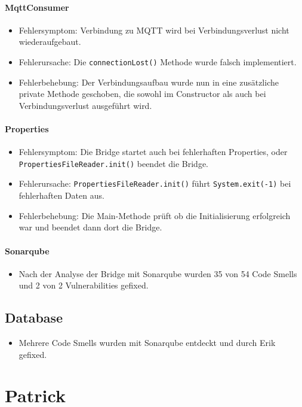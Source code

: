 \paragraph{MqttConsumer}
\begin{itemize}
	\item Fehlersymptom: Verbindung zu MQTT wird bei Verbindungsverlust nicht wiederaufgebaut.
	\item Fehlerursache: Die \texttt{connectionLost()} Methode wurde falsch implementiert.
	\item Fehlerbehebung: Der Verbindungsaufbau wurde nun in eine zusätzliche private Methode geschoben, die sowohl im Constructor als auch bei Verbindungsverlust ausgeführt wird.
\end{itemize}

\paragraph{Properties}
\begin{itemize}
	\item Fehlersymptom: Die Bridge startet auch bei fehlerhaften Properties, oder \texttt{PropertiesFileReader.init()} beendet die Bridge.
	\item Fehlerursache: \texttt{PropertiesFileReader.init()} führt \texttt{System.exit(-1)} bei fehlerhaften Daten aus.
	\item Fehlerbehebung: Die Main-Methode prüft ob die Initialisierung erfolgreich war und beendet dann dort die Bridge.
\end{itemize}

\paragraph{Sonarqube}
\begin{itemize}
	\item Nach der Analyse der Bridge mit Sonarqube wurden 35 von 54 Code Smells und 2 von 2 Vulnerabilities gefixed.
\end{itemize}

\subsection{Database}
\begin{itemize}
	\item Mehrere Code Smells wurden mit Sonarqube entdeckt und durch Erik gefixed.
\end{itemize}
\newpage
\section{Patrick}
